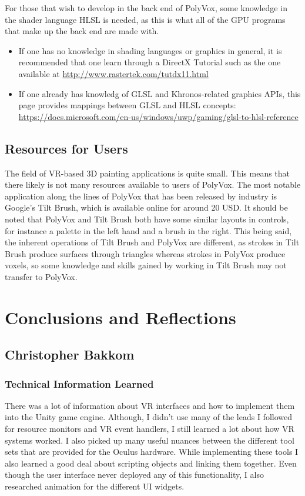 \documentclass[onecolumn, draftclsnofoot,10pt, compsoc]{IEEEtran}
\begin{document}
For those that wish to develop in the back end of PolyVox, some knowledge in the shader language HLSL is needed, as this is what all of the GPU programs that make up the back end are made with.
\begin{itemize}
\item If one has no knowledge in shading languages or graphics in general, it is recommended that one learn through a DirectX Tutorial such as the one available at \url{http://www.rastertek.com/tutdx11.html}
\item If one already has knowledg of GLSL and Khronos-related graphics APIs, this page provides mappings between GLSL and HLSL concepts: \url{https://docs.microsoft.com/en-us/windows/uwp/gaming/glsl-to-hlsl-reference}
\end{itemize}


\subsection{Resources for Users}
The field of VR-based 3D painting applications is quite small.
This means that there likely is not many resources available to users of PolyVox.
The most notable application along the lines of PolyVox that has been released by industry is Google’s Tilt Brush, which is available online for around 20 USD.
It should be noted that PolyVox and Tilt Brush both have some similar layouts in controls, for instance a palette in the left hand and a brush in the right.
This being said, the inherent operations of Tilt Brush and PolyVox are different, as strokes in Tilt Brush produce surfaces through triangles whereas strokes in PolyVox produce voxels, so some knowledge and skills gained by working in Tilt Brush may not transfer to PolyVox.


\section{Conclusions and Reflections}


\subsection{Christopher Bakkom}

\subsubsection{Technical Information Learned}
There was a lot of information about VR interfaces and how to implement them into the Unity game engine. Although, I didn't use many of the leads I followed for resource monitors and VR event handlers, I still learned a lot about how VR systems worked. I also picked up many useful nuances between the different tool sets that are provided for the Oculus hardware. While implementing these tools I also learned a good deal about scripting objects and linking them together. Even though the user interface never deployed any of this functionality, I also researched animation for the different UI widgets.  
\end{document}
